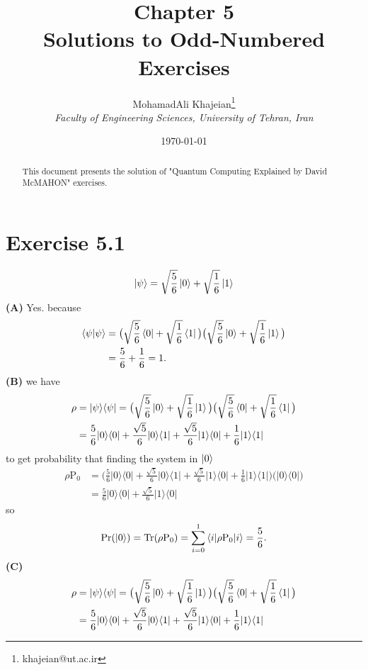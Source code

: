 \documentclass{article}
\title{\textbf{Chapter 5} \\ \small Solutions to Odd-Numbered Exercises}
\author{
    MohamadAli Khajeian\footnote{khajeian@ut.ac.ir} \\ 
    \small \textit{Faculty of Engineering Sciences, University of Tehran, Iran} \\ 
}
\date{\today}
\newcommand{\op}[2]{|#1\rangle \langle#2|}
\newcommand{\sand}[3]{\braket{#1 | #2 | #3}}
\begin{document}
\maketitle

\begin{abstract}
    This document presents the solution of "Quantum Computing Explained by David McMAHON" exercises.
\end{abstract}

\section*{Exercise 5.1}
\begin{align*}
    \ket{\psi} = \sqrt{\frac{5}{6}}\ket{0} + \sqrt{\frac{1}{6}}\ket{1}
\end{align*}
\textbf{(A)}
Yes. because
\begin{align*}
    \braket{\psi|\psi} &= \big(\sqrt{\frac{5}{6}}\bra{0} + \sqrt{\frac{1}{6}}\bra{1}\big)\big(\sqrt{\frac{5}{6}}\ket{0} + \sqrt{\frac{1}{6}}\ket{1}\big) \\
    &= \frac{5}{6} + \frac{1}{6} = 1.
\end{align*}
\textbf{(B)}
we have
\begin{align*}
    \rho &= \op{\psi}{\psi} = \big(\sqrt{\frac{5}{6}}\ket{0} + \sqrt{\frac{1}{6}}\ket{1}\big)\big(\sqrt{\frac{5}{6}}\bra{0} + \sqrt{\frac{1}{6}}\bra{1}\big) \\
    &= \frac{5}{6}\op{0}{0} + \frac{\sqrt{5}}{6}\op{0}{1} + \frac{\sqrt{5}}{6}\op{1}{0} + \frac{1}{6}\op{1}{1}
\end{align*}
to get probability that finding the system in $\ket{0}$
\begin{align*}
    \rho \text{P}_{0} &= \big(\frac{5}{6}\op{0}{0} + \frac{\sqrt{5}}{6}\op{0}{1} + \frac{\sqrt{5}}{6}\op{1}{0} + \frac{1}{6}\op{1}{1}\big)\big(\op{0}{0}\big) \\
    &= \frac{5}{6}\op{0}{0} + \frac{\sqrt{5}}{6}\op{1}{0}
\end{align*}
so
\begin{align*}
    \text{Pr}(\ket{0}) = \text{Tr}(\rho \text{P}_{0}) = \sum_{i=0}^{1} \sand{i}{\rho \text{P}_{0}}{i} =
     \frac{5}{6}.
\end{align*}
\textbf{(C)}
\begin{align*}
    \rho &= \op{\psi}{\psi} = \big(\sqrt{\frac{5}{6}}\ket{0} + \sqrt{\frac{1}{6}}\ket{1}\big)\big(\sqrt{\frac{5}{6}}\bra{0} + \sqrt{\frac{1}{6}}\bra{1}\big) \\
    &= \frac{5}{6}\op{0}{0} + \frac{\sqrt{5}}{6}\op{0}{1} + \frac{\sqrt{5}}{6}\op{1}{0} + \frac{1}{6}\op{1}{1}
\end{align*}
\end{document}
